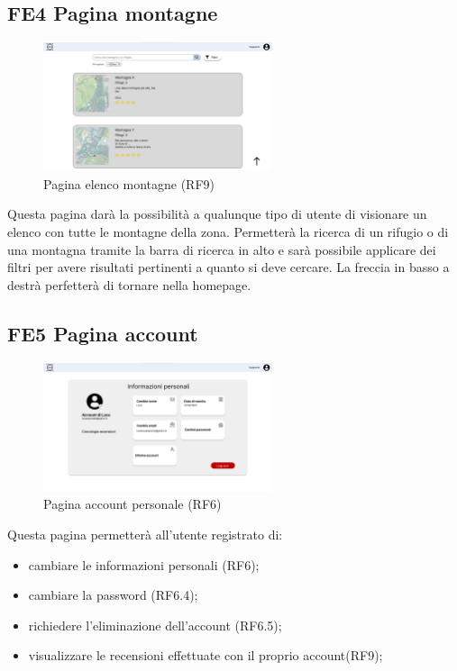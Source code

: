 \documentclass[a4paper,12pt]{article}
\begin{document}
\subsection*{FE4 Pagina montagne}
\begin{figure}[H]
   \centering
    \includegraphics[width=0.6\textwidth]{img/Pagina montagne.png}
    \caption{Pagina elenco montagne (RF9)}
\end{figure}
Questa pagina darà la possibilità a qualunque tipo di utente di visionare un elenco con tutte le montagne della zona. Permetterà la ricerca di un rifugio o di una montagna tramite la barra di ricerca in alto e sarà possibile applicare dei filtri per avere risultati pertinenti a quanto si deve cercare. La freccia in basso a destrà perfetterà di tornare nella homepage.


\subsection*{FE5 Pagina account}
\begin{figure}[H]
   \centering
    \includegraphics[width=0.6\textwidth]{img/Pagina account.png}
    \caption{Pagina account personale (RF6)}
\end{figure}


Questa pagina permetterà all'utente registrato di:
\begin{itemize}
    \item cambiare le informazioni personali (RF6);
    \item cambiare la password (RF6.4);
    \item richiedere l'eliminazione dell'account (RF6.5);
    \item visualizzare le recensioni effettuate con il proprio account(RF9);
\end{itemize}
\end{document}

